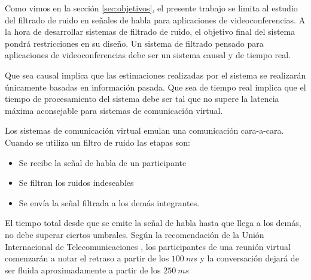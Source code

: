 Como vimos en la sección \ref{sec:objetivos}, el presente trabajo se limita al estudio del filtrado de ruido en señales de habla para aplicaciones de videoconferencias. A la hora de desarrollar sistemas de filtrado de ruido, el objetivo final del sistema pondrá restricciones en su diseño. Un sistema de filtrado pensado para aplicaciones de videoconferencias debe ser un sistema causal y de tiempo real.

Que sea causal implica que las estimaciones realizadas por el sistema se realizarán únicamente basadas en información pasada. Que sea de tiempo real implica que el tiempo de procesamiento del sistema debe ser tal que no supere la latencia máxima aconsejable para sistemas de comunicación virtual.

Los sistemas de comunicación virtual emulan una comunicación cara-a-cara. Cuando se utiliza un filtro de ruido las etapas son:

\begin{itemize}
	\item Se recibe la señal de habla de un participante
	\item Se filtran los ruidos indeseables
	\item Se envía la señal filtrada a los demás integrantes.
\end{itemize}

El tiempo total desde que se emite la señal de habla hasta que llega a los demás, no debe superar ciertos umbrales. Según la recomendación de la Unión Internacional de Telecomunicaciones \cite{itu_t_recommendation_g_114}, los participantes de una reunión virtual comenzarán a notar el retraso a partir de los $\SI{100}{ms}$ y la conversación dejará de ser fluida aproximadamente a partir de los $\SI{250}{ms}$
